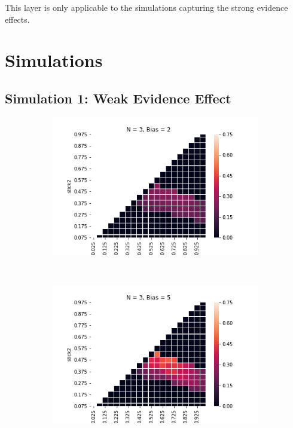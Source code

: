 \documentclass[10pt,letterpaper]{article}
\begin{document}
This layer is only applicable to the simulations capturing the strong evidence effects.

\section{Simulations}
\subsection{Simulation 1: Weak Evidence Effect}
\begin{figure}[h]
\centering
\begin{subfigure}{0.3\linewidth}
	\includegraphics[width=\linewidth]{figures/nSticks3bias2.png}
\end{subfigure}
~
\begin{subfigure}{0.3\linewidth}
	\includegraphics[width=\linewidth]{figures/nSticks3bias5.png}
\end{subfigure}

\end{figure}
\end{document}
